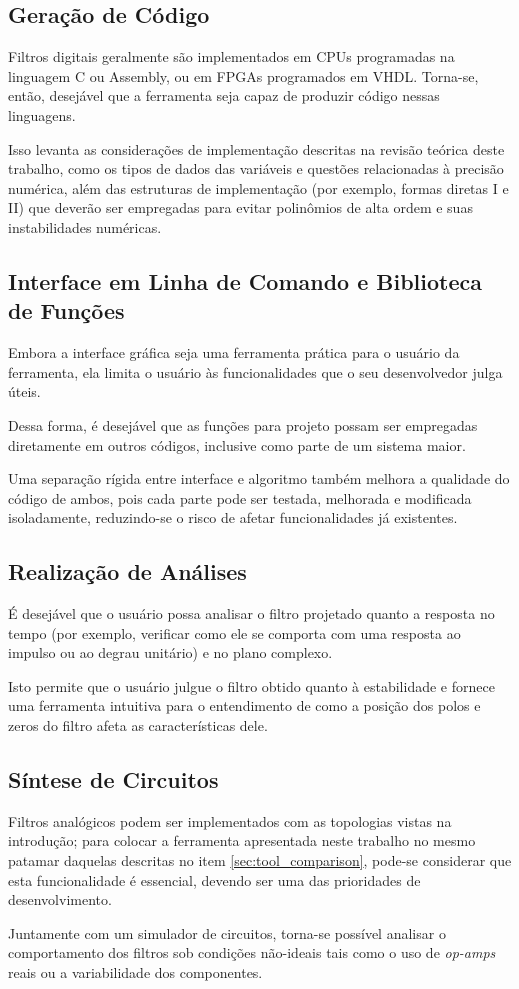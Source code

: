 \subsection{Geração de Código}
Filtros digitais geralmente são implementados em CPUs programadas na linguagem C ou Assembly, ou em FPGAs programados em VHDL. Torna-se, então, desejável que a ferramenta seja capaz de produzir código nessas linguagens.

Isso levanta as considerações de implementação descritas na revisão teórica deste trabalho, como os tipos de dados das variáveis e questões relacionadas à precisão numérica, além das estruturas de implementação (por exemplo, formas diretas I e II) que deverão ser empregadas para evitar polinômios de alta ordem e suas instabilidades numéricas.

\subsection{Interface em Linha de Comando e Biblioteca de Funções}
Embora a interface gráfica seja uma ferramenta prática para o usuário da ferramenta, ela limita o usuário às funcionalidades que o seu desenvolvedor julga úteis. 

Dessa forma, é desejável que as funções para projeto possam ser empregadas diretamente em outros códigos, inclusive como parte de um sistema maior.

Uma separação rígida entre interface e algoritmo também melhora a qualidade do código de ambos, pois cada parte pode ser testada, melhorada e modificada isoladamente, reduzindo-se o risco de afetar funcionalidades já existentes.

\subsection{Realização de Análises}
É desejável que o usuário possa analisar o filtro projetado quanto a resposta no tempo (por exemplo, verificar como ele se comporta com uma resposta ao impulso ou ao degrau unitário) e no plano complexo. 

Isto permite que o usuário julgue o filtro obtido quanto à estabilidade e fornece uma ferramenta intuitiva para o entendimento de como a posição dos polos e zeros do filtro afeta as características dele.

\subsection{Síntese de Circuitos}
Filtros analógicos podem ser implementados com as topologias vistas na introdução; para colocar a ferramenta apresentada neste trabalho no mesmo patamar daquelas descritas no item \ref{sec:tool_comparison}, pode-se considerar que esta funcionalidade é essencial, devendo ser uma das prioridades de desenvolvimento.

Juntamente com um simulador de circuitos, torna-se possível analisar o comportamento dos filtros sob condições não-ideais tais como o uso de \textit{op-amps} reais ou a variabilidade dos componentes.
